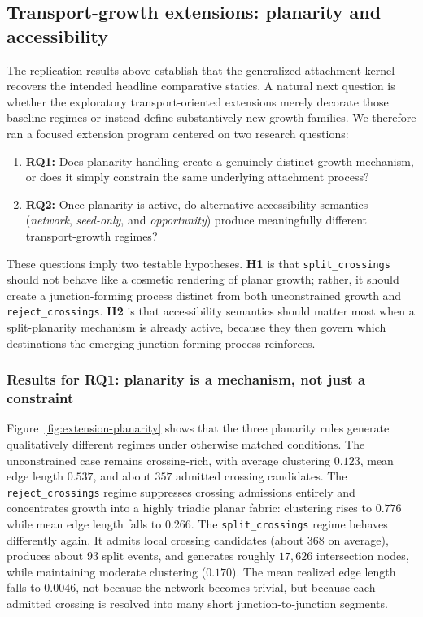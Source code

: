 \subsection{Transport-growth extensions: planarity and accessibility}
\label{sec:extensions}

The replication results above establish that the generalized attachment kernel
recovers the intended headline comparative statics. A natural next question is
whether the exploratory transport-oriented extensions merely decorate those
baseline regimes or instead define substantively new growth families. We
therefore ran a focused extension program centered on two research questions:
\begin{enumerate}[leftmargin=1.5em]
    \item \textbf{RQ1:} Does planarity handling create a genuinely distinct
    growth mechanism, or does it simply constrain the same underlying
    attachment process?
    \item \textbf{RQ2:} Once planarity is active, do alternative accessibility
    semantics (\emph{network}, \emph{seed-only}, and \emph{opportunity})
    produce meaningfully different transport-growth regimes?
\end{enumerate}

These questions imply two testable hypotheses. \textbf{H1} is that
\texttt{split\_crossings} should not behave like a cosmetic rendering of planar
growth; rather, it should create a junction-forming process distinct from both
unconstrained growth and \texttt{reject\_crossings}. \textbf{H2} is that
accessibility semantics should matter most when a split-planarity mechanism is
already active, because they then govern which destinations the emerging
junction-forming process reinforces.

\subsubsection{Results for RQ1: planarity is a mechanism, not just a constraint}

Figure~\ref{fig:extension-planarity} shows that the three planarity rules
generate qualitatively different regimes under otherwise matched conditions.
The unconstrained case remains crossing-rich, with average clustering $0.123$,
mean edge length $0.537$, and about $357$ admitted crossing candidates. The
\texttt{reject\_crossings} regime suppresses crossing admissions entirely and
concentrates growth into a highly triadic planar fabric: clustering rises to
$0.776$ while mean edge length falls to $0.266$. The
\texttt{split\_crossings} regime behaves differently again. It admits local
crossing candidates (about $368$ on average), produces about $93$ split
events, and generates roughly $17{,}626$ intersection nodes, while maintaining
moderate clustering ($0.170$). The mean realized edge length falls to
$0.0046$, not because the network becomes trivial, but because each admitted
crossing is resolved into many short junction-to-junction segments.


